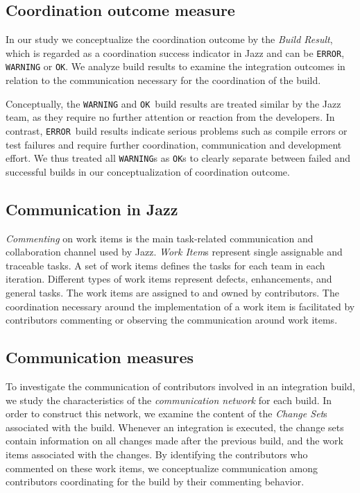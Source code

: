 \documentclass[12pt,oneside]{book}
\newcommand\error{\texttt{ERROR}}
\newcommand\ok{\texttt{OK}}
\newcommand{\et}[1]{\emph{#1}}
\begin{document}
\subsection{Coordination outcome measure}
In our study we conceptualize the coordination outcome by the \et{Build Result},
which is regarded as a coordination success indicator in Jazz and can be \error,
\texttt{WARNING} or \ok. We analyze build results to examine the integration
outcomes in relation to the communication necessary for the coordination of the
build.

Conceptually, the \texttt{WARNING} and \ok\ build results are treated similar by
the Jazz team, as they require no further attention or reaction from the
developers. In contrast, \error\ build results indicate serious problems such as
compile errors or test failures and require further coordination, communication
and development effort. We thus treated all \texttt{WARNING}s as \ok s to clearly
separate between failed and successful builds in our conceptualization of
coordination outcome.


\subsection{Communication in Jazz}

\et{Commenting} on work items is the main task-related communication and
collaboration channel used by Jazz. \et{Work Item}s represent single assignable
and traceable tasks. A set of work items defines the tasks for each team in each
iteration. Different types of work items represent defects, enhancements, and
general tasks. The work items are assigned to and owned by contributors. The
coordination necessary around the implementation of a work item is facilitated by
contributors commenting or observing the communication around work items.

\subsection{Communication measures}
To investigate the communication of contributors involved in an integration
build, we study the characteristics of the \emph{communication network} for each
build. In order to construct this network, we examine the content of the
\et{Change Set}s associated with the build. Whenever an integration is executed,
the change sets contain information on all changes made after the previous build,
and the work items associated with the changes. By identifying the contributors
who commented on these work items, we conceptualize communication among
contributors coordinating for the build by their commenting behavior.
\end{document}
